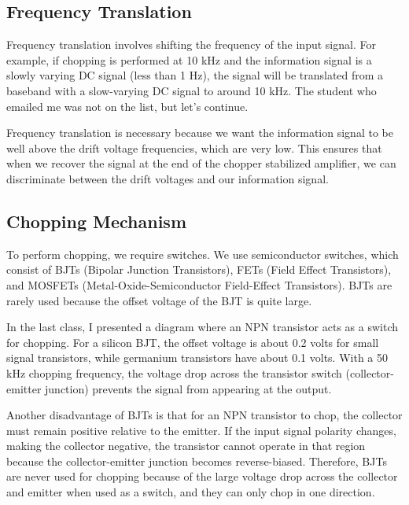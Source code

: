 \documentclass[a4paper,9pt,twoside,openany,twocolumn]{memoir}
\begin{document}
\subsection{Frequency Translation}
Frequency translation involves shifting the frequency of the input signal. For example, if chopping is performed at 10 kHz and the information signal is a slowly varying DC signal (less than 1 Hz), the signal will be translated from a baseband with a slow-varying DC signal to around 10 kHz. The student who emailed me was not on the list, but let's continue.

Frequency translation is necessary because we want the information signal to be well above the drift voltage frequencies, which are very low. This ensures that when we recover the signal at the end of the chopper stabilized amplifier, we can discriminate between the drift voltages and our information signal.

\subsection{Chopping Mechanism}
To perform chopping, we require switches. We use semiconductor switches, which consist of BJTs (Bipolar Junction Transistors), FETs (Field Effect Transistors), and MOSFETs (Metal-Oxide-Semiconductor Field-Effect Transistors). BJTs are rarely used because the offset voltage of the BJT is quite large.

In the last class, I presented a diagram where an NPN transistor acts as a switch for chopping. For a silicon BJT, the offset voltage is about 0.2 volts for small signal transistors, while germanium transistors have about 0.1 volts. With a 50 kHz chopping frequency, the voltage drop across the transistor switch (collector-emitter junction) prevents the signal from appearing at the output.

Another disadvantage of BJTs is that for an NPN transistor to chop, the collector must remain positive relative to the emitter. If the input signal polarity changes, making the collector negative, the transistor cannot operate in that region because the collector-emitter junction becomes reverse-biased. Therefore, BJTs are never used for chopping because of the large voltage drop across the collector and emitter when used as a switch, and they can only chop in one direction.
\end{document}
